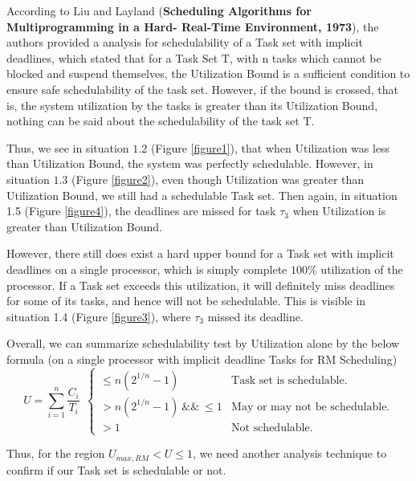 \documentclass[oneside,a4paper]{article}
\newcommand{\Tau}{\mathrm{T}}
\begin{document}
 According to Liu and Layland (\textbf{Scheduling Algorithms for Multiprogramming in a Hard- Real-Time Environment, 1973}), the authors provided a analysis for schedulability of a Task set with implicit deadlines, which stated that for a Task Set $\Tau$, with n tasks which cannot be blocked and suspend themselves, the Utilization Bound is a sufficient condition to ensure safe schedulability of the task set. However, if the bound is crossed, that is, the system utilization by the tasks is greater than its Utilization Bound, nothing can be said about the schedulability of the task set $\Tau$.\par
 Thus, we see in situation $1.2$ (Figure \ref{figure1}), that when Utilization was less than Utilization Bound, the system was perfectly schedulable. However, in situation $1.3$ (Figure \ref{figure2}), even though Utilization was greater than Utilization Bound, we still had a schedulable Task set. Then again, in situation 1.5 (Figure \ref{figure4}), the deadlines are missed for task $\tau_3$ when Utilization is greater than Utilization Bound.\par
 However, there still does exist a hard upper bound for a Task set with implicit deadlines on a single processor, which is simply complete $100 \%$ utilization of the processor. If a Task set exceeds this utilization, it will definitely miss deadlines for some of its tasks, and hence will not be schedulable. This is visible in situation 1.4 (Figure \ref{figure3}), where $\tau_3$ missed its deadline.\par
 Overall, we can summarize schedulability test by Utilization alone by the below formula (on a single processor with implicit deadline Tasks for RM Scheduling)
 $$U = \sum_{i=1}^{n} \frac{C_i}{T_i} \ \ 
\left\{
    \begin{array}{ll}
        \leq n(2^{1/n} - 1) & \mbox{Task set is schedulable.}  \\
        > n(2^{1/n} - 1) \ \&\& \ \leq 1  & \mbox{May or may not be schedulable.} \\
        > 1 & \mbox{Not schedulable.}
    \end{array}
\right.$$\par
Thus, for the region $U_{max,RM} < U \leq 1 $, we need another analysis technique to confirm if our Task set is schedulable or not.
\pagebreak
\end{document}
